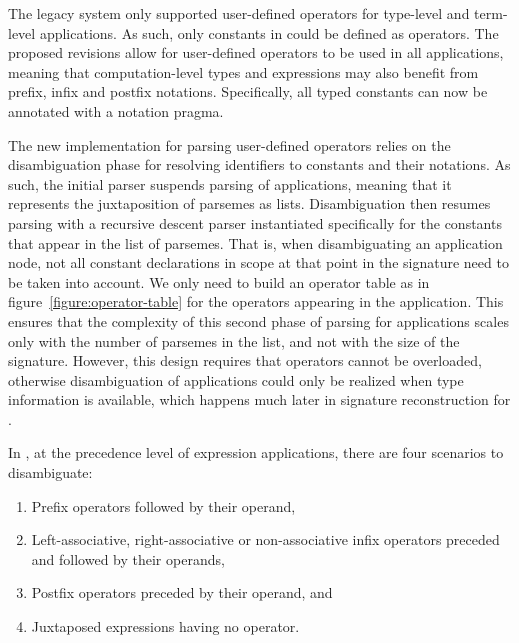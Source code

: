 The legacy \Beluga system only supported user-defined operators for \LF type-level and term-level applications.
As such, only constants in \LF could be defined as operators.
The proposed revisions allow for user-defined operators to be used in all applications, meaning that computation-level types and expressions may also benefit from prefix, infix and postfix notations.
Specifically, all typed constants can now be annotated with a notation pragma.

The new implementation for parsing user-defined operators relies on the disambiguation phase for resolving identifiers to constants and their notations.
As such, the initial parser suspends parsing of applications, meaning that it represents the juxtaposition of parsemes as lists.
Disambiguation then resumes parsing with a recursive descent parser instantiated specifically for the constants that appear in the list of parsemes.
That is, when disambiguating an application node, not all constant declarations in scope at that point in the \Beluga signature need to be taken into account.
We only need to build an operator table as in figure~\ref{figure:operator-table} for the operators appearing in the application.
This ensures that the complexity of this second phase of parsing for applications scales only with the number of parsemes in the list, and not with the size of the signature.
However, this design requires that operators cannot be overloaded, otherwise disambiguation of applications could only be realized when type information is available, which happens much later in signature reconstruction for \Beluga.

In \Beluga, at the precedence level of expression applications, there are four scenarios to disambiguate:
\begin{enumerate}
\item Prefix operators followed by their operand,
\item Left-associative, right-associative or non-associative infix operators preceded and followed by their operands,
\item Postfix operators preceded by their operand, and
\item Juxtaposed expressions having no operator.
\end{enumerate}


